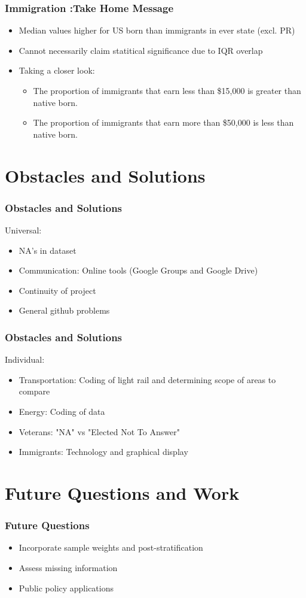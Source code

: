\documentclass{beamer}
\begin{document}
\begin{frame}
\frametitle{Immigration :Take Home Message}
\begin{itemize}
\item Median values higher for US born than immigrants in ever state (excl. PR)
\item Cannot necessarily claim statitical significance due to IQR overlap
\item Taking a closer look: 
\begin{itemize}
\item The proportion of immigrants that earn less than \$15,000 is greater than native born. 
\item The proportion of immigrants that earn more than \$50,000 is less than native born. 
\end{itemize}
\end{itemize}

\end{frame}



\section{Obstacles and Solutions }
\begin{frame}
\frametitle{Obstacles and Solutions}
Universal:
  \begin{itemize}
\item NA's in dataset
\item Communication: Online tools (Google Groups and Google Drive)
\item Continuity of project
\item General github problems
\end{itemize}
\end{frame}

\begin{frame}
\frametitle{Obstacles and Solutions}
Individual:
\begin{itemize}
\item Transportation: Coding of light rail and determining scope of areas to compare
\item Energy: Coding of data
\item Veterans: "NA" vs "Elected Not To Answer"
\item Immigrants: Technology and graphical display
\end{itemize}
\end{frame}

\section{Future Questions and Work}
\begin{frame}
\frametitle{Future Questions}
\begin{itemize}
\item Incorporate sample weights and post-stratification 
\item Assess missing information 
\item Public policy applications 
\end{itemize}
\end{frame}
\end{document}
